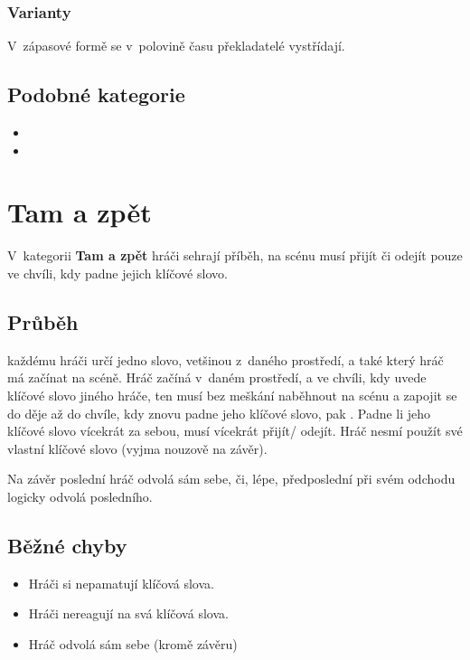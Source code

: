\subsubsection{ Varianty } V~zápasové formě se v~polovině času překladatelé vystřídají. 
 
\subsection{ Podobné kategorie } \begin{itemize}
\item  {}
\item  {}
\end{itemize}
 
 
 
 
\needspace{5cm} \section{Tam a zpět} \label{tam a zpět}  
 
 
V~kategorii \textbf{Tam a zpět} hráči sehrají příběh, na scénu musí přijít či odejít pouze ve chvíli, kdy padne jejich klíčové slovo. 
 
 
\subsection{Průběh}  každému hráči určí jedno slovo, vetšinou z~daného prostředí, a také který hráč má začínat na scéně. 
Hráč začíná v~daném prostředí, a ve chvíli, kdy uvede klíčové slovo jiného hráče, ten musí bez meškání naběhnout na scénu a zapojit se do děje až do chvíle, kdy znovu padne jeho klíčové slovo, pak . Padne li jeho klíčové slovo vícekrát za sebou, musí vícekrát přijít/ odejít. Hráč nesmí použít své vlastní klíčové slovo (vyjma nouzově na závěr). 
 
Na závěr poslední hráč odvolá sám sebe, či, lépe, předposlední při svém odchodu logicky odvolá posledního. 
 
\subsection{ Běžné chyby } \begin{itemize}
\item Hráči si nepamatují klíčová slova.
\item Hráči nereagují na svá klíčová slova.
\item Hráč odvolá sám sebe (kromě závěru)
\end{itemize}
 
